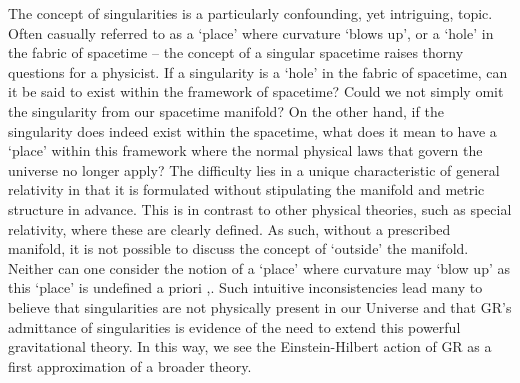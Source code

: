 
The concept of singularities is a particularly confounding, yet intriguing, topic. Often casually referred to as a `place' where curvature `blows up', or a `hole' in the fabric of spacetime -- the concept of a singular spacetime raises thorny questions for a physicist. If a singularity is a `hole' in the fabric of spacetime, can it be  said to exist within the framework of spacetime? Could we not simply omit the singularity from our spacetime manifold? On the other hand, if the singularity does indeed exist within the spacetime, what does it mean to have a `place' within this framework where the normal physical laws that govern the universe no longer apply? The difficulty lies in a unique characteristic of general relativity in that it is formulated without stipulating the manifold and metric structure in advance. This is in contrast to other physical theories, such as special relativity, where these are clearly defined. As such, without a prescribed manifold, it is not possible to discuss the concept of `outside' the manifold. Neither can one consider the notion of a `place' where curvature may `blow up' as this `place' is undefined a priori \cite{Geroch:1968ut},\cite{Wald:GR}.  Such intuitive inconsistencies lead many to believe that singularities are not physically present in our Universe and that GR's admittance of singularities is evidence of the need to extend this powerful gravitational theory. In this way, we see the Einstein-Hilbert action of GR as a first approximation of a broader theory.

